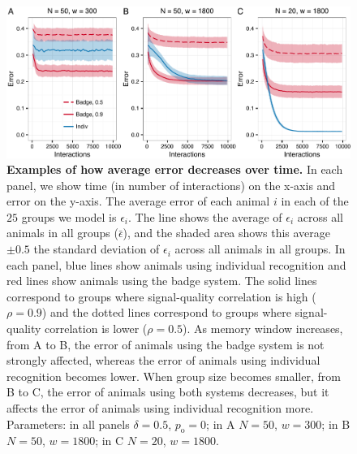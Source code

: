 \begin{figure}

\includegraphics[width=.95\textwidth]{figures/learning_curves.pdf}
\caption{\label{learning_curves} \sffamily\small\textbf{Examples of how average error decreases over time.}
In each panel, we show time (in number of interactions) on the x-axis and error on the y-axis. The average error of each animal $i$ in each of the $25$ groups we model is $\epsilon_i$. The line shows the average of $\epsilon_i$ across all animals in all groups ($\bar{\epsilon}$), and the shaded area shows this average $\pm 0.5$ the standard deviation of $\epsilon_i$ across all animals in all groups. In each panel, blue lines show animals using individual recognition and red lines show animals using the badge system. The solid lines correspond to groups where signal-quality correlation is high ($\rho=0.9$) and the dotted lines correspond to groups where signal-quality correlation is lower ($\rho=0.5$). As memory window increases, from A to B, the error of animals using the badge system is not strongly affected, whereas the error of animals using individual recognition becomes lower. When group size becomes smaller, from B to C, the error of animals using both systems decreases, but it affects the error of animals using individual recognition more.  Parameters: in all panels $\delta = 0.5$, $p_\text{o}=0$; in A $N=50$, $w=300$; in B $N=50$, $w=1800$; in C $N=20$, $w=1800$. }
\end{figure}


